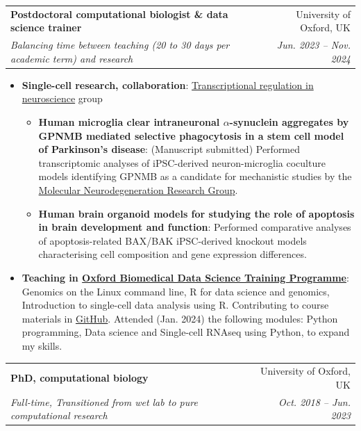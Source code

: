 \documentclass{article}
\makeatletter
\newcommand{\resumeItem}[2]{
  \item\small{
    \textbf{#1}{: #2 \vspace{-2pt}}
  }
}
\newcommand{\resumeSubheading}[4]{
  \vspace{-1pt}\item
    \begin{tabular*}{0.97\textwidth}[t]{l@{\extracolsep{\fill}}r}
      \textbf{#1} & #2 \\
      \textit{\small#3} & \textit{\small #4} \\
    \end{tabular*}\vspace{-5pt}
}
\newcommand{\resumeItemListStart}{\begin{itemize}}
\newcommand{\resumeItemListEnd}{\end{itemize}\vspace{-5pt}}
\makeatother
\begin{document}
        \resumeSubheading
        {Postdoctoral computational biologist \& data science trainer}{University of Oxford, UK}{Balancing time between teaching (20 to 30 days per academic term) and research}{Jun. 2023 -- Nov. 2024}
            \resumeItemListStart
                \resumeItem{Single-cell research, collaboration} {\href{https://www.rdm.ox.ac.uk/people/david-sims}{Transcriptional regulation in neuroscience} group}
                \begin{itemize}
                    \resumeItem{Human microglia clear intraneuronal $\alpha$-synuclein aggregates by GPNMB mediated selective phagocytosis in a stem cell model of Parkinson’s disease}{(Manuscript submitted) Performed transcriptomic analyses of iPSC-derived neuron-microglia coculture models identifying GPNMB as a candidate for  mechanistic studies by the \href{https://www.ndcn.ox.ac.uk/research/molecular-neurodegeneration-research-group}{Molecular Neurodegeneration Research Group}.}
                    \resumeItem{Human brain organoid models for studying the role of apoptosis in brain development and function}{Performed comparative analyses of apoptosis-related BAX/BAK iPSC-derived knockout models characterising cell composition and gene expression differences.}
                \end{itemize}
                \resumeItem{Teaching in \href{https://www.imm.ox.ac.uk/research/units-and-centres/mrc-wimm-centre-for-computational-biology/training/oxford-biomedical-data-science-training-programme}{Oxford Biomedical Data Science Training Programme}}{Genomics on the Linux command line, R for data science and genomics, Introduction to single-cell data analysis using R. Contributing to course materials in {\href{https://github.com/kevinrue/OBDS_slides}{GitHub}}. Attended (Jan. 2024) the following modules: Python programming, Data science and Single-cell RNAseq using Python, to expand my skills.}
            \resumeItemListEnd
        \resumeSubheading
        {PhD, computational biology}{University of Oxford, UK}{Full-time, Transitioned from wet lab to pure computational research}{Oct. 2018 -- Jun. 2023}
\end{document}
